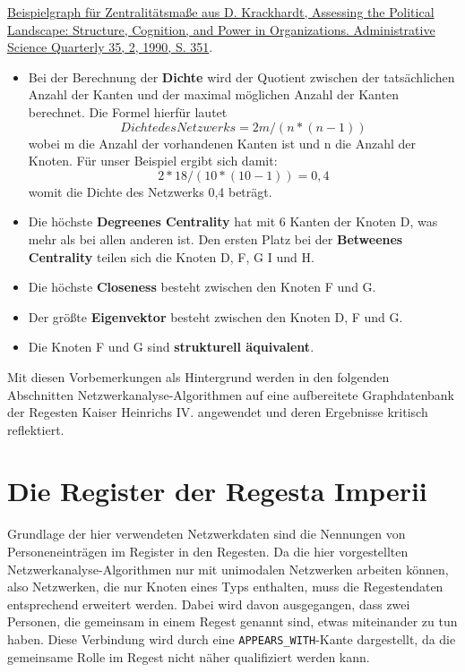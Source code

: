 \documentclass[ngerman,]{scrreprt}
\begin{document}
\href{http://dx.doi.org/10.2307/2393394}{Beispielgraph für Zentralitätsmaße aus D. Krackhardt, Assessing the Political Landscape: Structure, Cognition, and Power in Organizations. Administrative Science Quarterly 35, 2, 1990, S. 351}.

\begin{itemize}
\item
  Bei der Berechnung der \textbf{Dichte} wird der Quotient zwischen der tatsächlichen Anzahl der Kanten und der maximal möglichen Anzahl der Kanten berechnet. Die Formel hierfür lautet \[Dichte des Netzwerks = 2m/(n*(n-1))\] wobei m die Anzahl der vorhandenen Kanten ist und n die Anzahl der Knoten. Für unser Beispiel ergibt sich damit: \[2*18/(10*(10-1)) = 0,4\] womit die Dichte des Netzwerks 0,4 beträgt.
\item
  Die höchste \textbf{Degreenes Centrality} hat mit 6 Kanten der Knoten D, was mehr als bei allen anderen ist. Den ersten Platz bei der \textbf{Betweenes Centrality} teilen sich die Knoten D, F, G I und H.
\item
  Die höchste \textbf{Closeness} besteht zwischen den Knoten F und G.
\item
  Der größte \textbf{Eigenvektor} besteht zwischen den Knoten D, F und G.
\item
  Die Knoten F und G sind \textbf{strukturell äquivalent}.
\end{itemize}

Mit diesen Vorbemerkungen als Hintergrund werden in den folgenden Abschnitten Netzwerkanalyse-Algorithmen auf eine aufbereitete Graphdatenbank der Regesten Kaiser Heinrichs IV. angewendet und deren Ergebnisse kritisch reflektiert.

\section{Die Register der Regesta Imperii}\label{die-register-der-regesta-imperii}

Grundlage der hier verwendeten Netzwerkdaten sind die Nennungen von Personeneinträgen im Register in den Regesten. Da die hier vorgestellten Netzwerkanalyse-Algorithmen nur mit unimodalen Netzwerken arbeiten können, also Netzwerken, die nur Knoten eines Typs enthalten, muss die Regestendaten entsprechend erweitert werden. Dabei wird davon ausgegangen, dass zwei Personen, die gemeinsam in einem Regest genannt sind, etwas miteinander zu tun haben. Diese Verbindung wird durch eine \texttt{APPEARS\_WITH}-Kante dargestellt, da die gemeinsame Rolle im Regest nicht näher qualifiziert werden kann.
\end{document}
